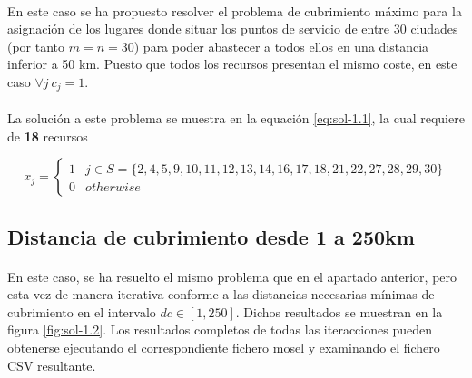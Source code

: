 \documentclass[spanish]{article}
\begin{document}
			\paragraph{}
			En este caso se ha propuesto resolver el problema de cubrimiento máximo para la asignación de los lugares donde situar los puntos de servicio de entre 30 ciudades (por tanto $m = n = 30$) para poder abastecer a todos ellos en una distancia inferior a 50 km. Puesto que todos los recursos presentan el mismo coste, en este caso $\forall j \ c_{j} = 1$.

			\paragraph{}
			La solución a este problema se muestra en la equación \eqref{eq:sol-1.1}, la cual requiere de \textbf{18} recursos

			\begin{equation}
			\label{eq:sol-1.1}
				x_{j} =
					\begin{cases}
		      	1 & j \in S = \{2,  4,  5,  9,  10,  11,  12,  13,  14,  16,  17,  18,  21,  22,  27,  28,  29,  30 \} \\
		      	0 & otherwise
			   	\end{cases}
			\end{equation}

		\subsection{Distancia de cubrimiento desde 1 a 250km}
		\label{sec:1.2}

			\paragraph{}
			En este caso, se ha resuelto el mismo problema que en el apartado anterior, pero esta vez de manera iterativa conforme a las distancias necesarias mínimas de cubrimiento en el intervalo $dc \in [1, 250]$. Dichos resultados se muestran en la figura \ref{fig:sol-1.2}. Los resultados completos de todas las iteracciones pueden obtenerse ejecutando el correspondiente fichero mosel\cite{garciparedes:mosel-examples} y examinando el fichero CSV resultante.
\end{document}
